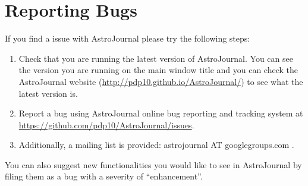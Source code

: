 \section{Reporting Bugs}
\label{sec:Reporting Bugs}
If you find a issue with AstroJournal please try the following steps:
\begin{enumerate}
 \item Check that you are running the latest version of AstroJournal. You can see the version you are running on the main window title and you can check the AstroJournal website (\href{http://pdp10.github.io/AstroJournal/}{http://pdp10.github.io/AstroJournal/}) to see what the latest version is.
 \item Report a bug using AstroJournal online bug reporting and tracking
system at \href{https://github.com/pdp10/AstroJournal/issues}{https://github.com/pdp10/AstroJournal/issues}.
 \item Additionally, a mailing list is provided: astrojournal AT googlegroups.com .
\end{enumerate}
You can also suggest new functionalities you would like to see in AstroJournal by filing them as a bug with a severity of ``enhancement''.


